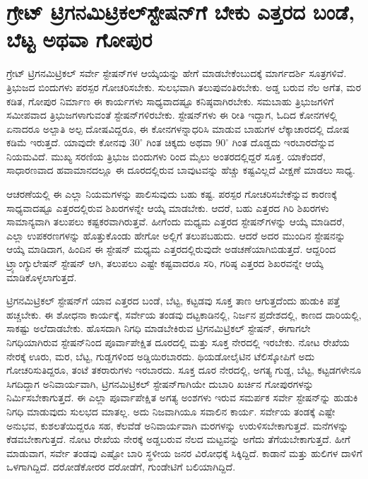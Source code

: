 
\chapter{ಗ್ರೇಟ್​ ಟ್ರಿಗನಮಿಟ್ರಿಕಲ್​ ಸ್ಟೇಷನ್​ಗೆ ಬೇಕು ಎತ್ತರದ ಬಂಡೆ, ಬೆಟ್ಟ ಅಥವಾ ಗೋಪುರ}

ಗ್ರೇಟ್​ ಟ್ರಿಗನಮಿಟ್ರಿಕಲ್​ ಸರ್ವೇ ಸ್ಟೇಷನ್​ಗಳ ಆಯ್ಕೆಯನ್ನು ಹೇಗೆ ಮಾಡಬೇಕೆಂಬುದಕ್ಕೆ ಮಾರ್ಗದರ್ಶಿ ಸೂತ್ರಗಳಿವೆ. ತ್ರಿಭುಜದ ಬಿಂದುಗಳು ಪರಸ್ಪರ ಗೋಚರಿಸಬೇಕು. ಸುಲಭವಾಗಿ ತಲುಪುವಂತಿರಬೇಕು. ಅಡ್ಡ ಬರುವ ನೆಲ ಅಗೆತ, ಮರ ಕಡಿತ, ಗೋಪುರ ನಿರ್ಮಾಣ ಈ ಕಾರ್ಯಗಳು ಸಾಧ್ಯವಾದಷ್ಟೂ ಕನಿಷ್ಠವಾಗಿರಬೇಕು. ಸಮಬಾಹು ತ್ರಿಭುಜಗಳಿಗೆ ಸಮೀಪವಾದ ತ್ರಿಭುಜಗಳಾಗುವಂತೆ ಸ್ಟೇಷನ್​ಗಳಿರಬೇಕು. ಸ್ಟೇಷನ್​ಗಳು ಈ ರೀತಿ ಇದ್ದಾಗ, ಓದಿದ ಕೋನಗಳಲ್ಲಿ ಏನಾದರೂ ಅಲ್ಪಾತಿ ಅಲ್ಪ ದೋಷವಿದ್ದರೂ, ಈ ಕೋನಗಳನ್ನಾಧರಿಸಿ ಮಾಡುವ ಬಾಹುಗಳ ಲೆಕ್ಕಾಚಾರದಲ್ಲಿ ದೋಷ ಕಡಿಮೆ ಇರುತ್ತದೆ. ಯಾವುದೇ ಕೋನವು $30^\circ$ ಗಿಂತ ಚಿಕ್ಕದು ಅಥವಾ $90^\circ$ ಗಿಂತ ದೊಡ್ಡದು ಇರಬಾರದೆನ್ನುವ ನಿಯಮವಿದೆ. ಮುಖ್ಯ ಸರಣಿಯ ತ್ರಿಭುಜ ಬಿಂದುಗಳು  ರಿಂದ  ಮೈಲು ಅಂತರದಲ್ಲಿದ್ದರೆ ಸೂಕ್ತ. ಯಾಕೆಂದರೆ, ಸಾಧಾರಣವಾದ ಹವಾಮಾನದಲ್ಲೂ ಈ ದೂರದಲ್ಲಿರುವ ಬಾವುಟವನ್ನು ಹೆಚ್ಚು ಕಷ್ಟವಿಲ್ಲದೆ ವೀಕ್ಷಣೆ ಮಾಡಲು ಸಾಧ್ಯ.

ಆಚರಣೆಯಲ್ಲಿ ಈ ಎಲ್ಲಾ ನಿಯಮಗಳನ್ನು ಪಾಲಿಸುವುದು ಬಹು ಕಷ್ಟ. ಪರಸ್ಪರ ಗೋಚರಿಸಬೇಕೆನ್ನುವ ಕಾರಣಕ್ಕೆ ಸಾಧ್ಯವಾದಷ್ಟೂ ಎತ್ತರದಲ್ಲಿರುವ ಶಿಖರಗಳನ್ನೇ ಆಯ್ಕೆ ಮಾಡಬೇಕು. ಆದರೆ, ಬಹು ಎತ್ತರದ ಗಿರಿ ಶಿಖರಗಳು ಸಾಮಾನ್ಯವಾಗಿ ತಲುಪಲು ಕಷ್ಟಕರವಾಗಿರುತ್ತವೆ. ಹೀಗೆಂದು ಮಧ್ಯಮ ಎತ್ತರದ ಸ್ಟೇಷನ್​ಗಳನ್ನು ಆಯ್ಕೆ ಮಾಡಿದರೆ, ಎಲ್ಲಾ ಉಪಕರಣಗಳನ್ನು ಹೊತ್ತುಕೊಂಡು ಹೇಗೋ ಅಲ್ಲಿಗೆ ತಲುಪಬಹುದು. ಆದರೆ ಅದರ ಮುಂದಿನ ಸ್ಟೇಷನನ್ನು ಆಯ್ಕೆ ಮಾಡಿದಾಗ, ಹಿಂದಿನ ಈ ಸ್ಟೇಷನ್​ ಮಧ್ಯಮ ಎತ್ತರದಲ್ಲಿರುವುದೇ ಅಡಚಣೆಯಾಗಿಬಿಡುತ್ತದೆ. ಆದ್ದರಿಂದ ಟ್ರ್ಯಾಂಗ್ಯುಲೇಷನ್​ ಸ್ಟೇಷನ್​ ಆಗಿ, ತಲುಪಲು ಎಷ್ಟೇ ಕಷ್ಟವಾದರೂ ಸರಿ, ಗರಿಷ್ಠ ಎತ್ತರದ ಶಿಖರವನ್ನೇ ಆಯ್ಕೆ ಮಾಡಿಕೊಳ್ಳಲಾಗುತ್ತದೆ.

ಟ್ರಿಗನಮಿಟ್ರಿಕಲ್​ ಸ್ಟೇಷನ್​ಗೆ ಯಾವ ಎತ್ತರದ ಬಂಡೆ, ಬೆಟ್ಟ, ಕಟ್ಟಡವು ಸೂಕ್ತ ತಾಣ ಆಗುತ್ತದೆಂದು ಹುಡುಕಿ ಪತ್ತೆ ಹಚ್ಚಬೇಕು. ಈ ಶೋಧನಾ ಕಾರ್ಯಕ್ಕೆ, ಸರ್ವೇಯ ತಂಡವು ದಟ್ಟಕಾಡಿನಲ್ಲಿ, ನಿರ್ಜನ ಪ್ರದೇಶದಲ್ಲಿ, ಕಾಣದ ದಾರಿಯಲ್ಲಿ, ಸಾಕಷ್ಟು ಅಲೆದಾಡಬೇಕು. ಹೊಸದಾಗಿ ನಿಗಧಿ ಮಾಡಬೇಕಿರುವ ಟ್ರಿಗನಮಿಟ್ರಿಕಲ್​ ಸ್ಟೇಷನ್​, ಈಗಾಗಲೇ ನಿಗಧಿಯಾಗಿರುವ ಸ್ಟೇಷನ್​ನಿಂದ ಪೂರ್ವಾಪೇಕ್ಷಿತ ದೂರದಲ್ಲಿ ಮತ್ತು ಸೂಕ್ತ ನೇರದಲ್ಲಿ ಇರಬೇಕು. ನೋಟ ರೇಖೆಯ ನೇರಕ್ಕೆ ಊರು, ಮರ, ಬೆಟ್ಟ, ಗುಡ್ಡಗಳಿಂದ ಅಡ್ಡಿಯಿರಬಾರದು. ಥಿಯಡೋಲೈಟಿನ ಟೆಲಿಸ್ಕೋಪಿಗೆ ಅದು ಗೋಚರಿಸುತಿದ್ದರೂ, ತಂಟೆ ತಕರಾರುಗಳು ಇರಬಾರದು. ಸೂಕ್ತ ದೂರ ನೇರದಲ್ಲಿ, ಅಗತ್ಯ ಗುಡ್ಡ, ಬೆಟ್ಟ, ಕಟ್ಟಡಗಳೇನೂ ಸಿಗದಿದ್ದಾಗ ಅನಿವಾರ್ಯವಾಗಿ, ಟ್ರಿಗನಮಿಟ್ರಿಕಲ್​ ಸ್ಟೇಷನ್​ಗಾಗಿಯೇ ದುಬಾರಿ ಖರ್ಚಿನ ಗೋಪುರಗಳನ್ನು ನಿರ್ಮಿಸಬೇಕಾಗುತ್ತದೆ. ಈ ಎಲ್ಲಾ ಪೂರ್ವಾಪೇಕ್ಷಿತ ಅಗತ್ಯ ಅಂಶಗಳು ಇರುವ ಸಮರ್ಪಕ ಸರ್ವೇ ಸ್ಟೇಷನ್​‌ನ್ನು ಹುಡುಕಿ ನಿಗಧಿ ಮಾಡುವುದು ಸುಲಭದ ಮಾತಲ್ಲ. ಅದು ನಿಜವಾಗಿಯೂ ಸವಾಲಿನ ಕಾರ್ಯ. ಸರ್ವೇಯ ತಂಡಕ್ಕೆ ಎಷ್ಟೇ ಅನುಭವ, ಕುಶಲತೆಯಿದ್ದರೂ ಸಹ, ಕೆಲವೆಡೆ ಅನಿವಾರ್ಯವಾಗಿ ಮರಗಳನ್ನು ಉರುಳಿಸಬೇಕಾಗುತ್ತದೆ. ಮನೆಗಳನ್ನು ಕೆಡವಬೇಕಾಗುತ್ತದೆ. ನೋಟ ರೇಖೆಯ ನೇರಕ್ಕೆ ಅಡ್ಡಬರುವ ನೆಲದ ಮಟ್ಟವನ್ನು ಅಗೆದು ತೆಗೆಯಬೇಕಾಗುತ್ತದೆ. ಹೀಗೆ ಮಾಡುವಾಗ, ಸರ್ವೇ ತಂಡವು ಎಷ್ಟೋ ಬಾರಿ ಸ್ಥಳೀಯ ಜನರ ವಿರೋಧಕ್ಕೆ ಸಿಕ್ಕಿದ್ದಿದೆ. ಕಾಡಾನೆ ಮತ್ತು ಹುಲಿಗಳ ದಾಳಿಗೆ ಒಳಗಾಗಿದ್ದಿದೆ. ದರೋಡೆಕೋರರ ದರೋಡೆಗೆ, ಗುಂಡೇಟಿಗೆ ಬಲಿಯಾಗಿದ್ದಿದೆ.

